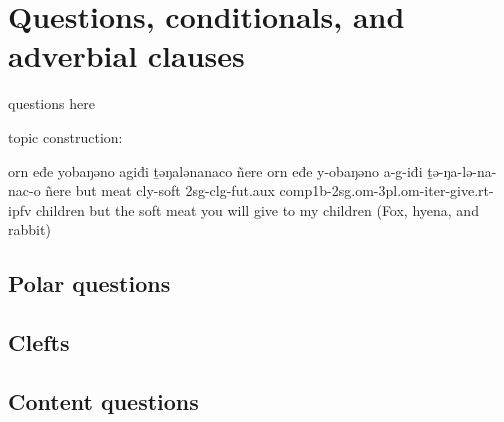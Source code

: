 \chapter{Questions, conditionals, and adverbial clauses}\label{chapter:questions}

questions here

topic construction:

orn eđe yobaŋǝno agiđi ṯǝŋalǝnanaco ñere
orn eđe  y-obaŋǝno a-g-iđi ṯǝ-ŋa-lǝ-na-nac-o ñere
but meat cly-soft  2sg-clg-fut.aux comp1b-2sg.om-3pl.om-iter-give.rt-ipfv children 
but the soft meat you will give to my children (Fox, hyena, and rabbit)


\section{Polar questions}\label{ynquestion}


\section{Clefts}\label{clefts}

\section{Content questions}\label{content}


%
%
%
%


